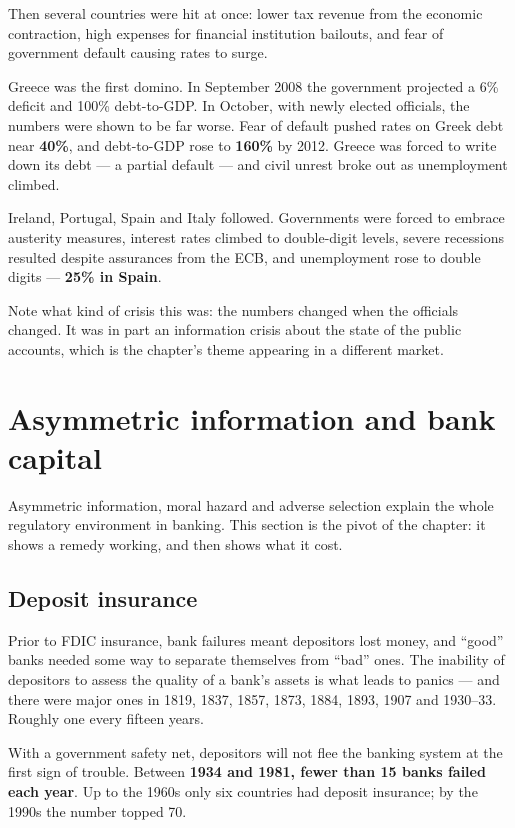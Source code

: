 \documentclass[11pt,a4paper]{article}
\begin{document}
Then several countries were hit at once: lower tax revenue from the economic
contraction, high expenses for financial institution bailouts, and fear of
government default causing rates to surge.

Greece was the first domino. In September 2008 the government projected a 6\%
deficit and 100\% debt-to-GDP. In October, with newly elected officials, the
numbers were shown to be far worse. Fear of default pushed rates on Greek debt
near \textbf{40\%}, and debt-to-GDP rose to \textbf{160\%} by 2012. Greece was
forced to write down its debt --- a partial default --- and civil unrest broke
out as unemployment climbed.

Ireland, Portugal, Spain and Italy followed. Governments were forced to embrace
austerity measures, interest rates climbed to double-digit levels, severe
recessions resulted despite assurances from the ECB, and unemployment rose to
double digits --- \textbf{25\% in Spain}.

Note what kind of crisis this was: the numbers changed when the officials
changed. It was in part an information crisis about the state of the public
accounts, which is the chapter's theme appearing in a different market.

\section{Asymmetric information and bank capital}

Asymmetric information, moral hazard and adverse selection explain the whole
regulatory environment in banking. This section is the pivot of the chapter: it
shows a remedy working, and then shows what it cost.

\subsection*{Deposit insurance}

Prior to FDIC insurance, bank failures meant depositors lost money, and ``good''
banks needed some way to separate themselves from ``bad'' ones. The inability of
depositors to assess the quality of a bank's assets is what leads to panics ---
and there were major ones in 1819, 1837, 1857, 1873, 1884, 1893, 1907 and
1930--33. Roughly one every fifteen years.

With a government safety net, depositors will not flee the banking system at the
first sign of trouble. Between \textbf{1934 and 1981, fewer than 15 banks failed
each year}. Up to the 1960s only six countries had deposit insurance; by the
1990s the number topped 70.
\end{document}
